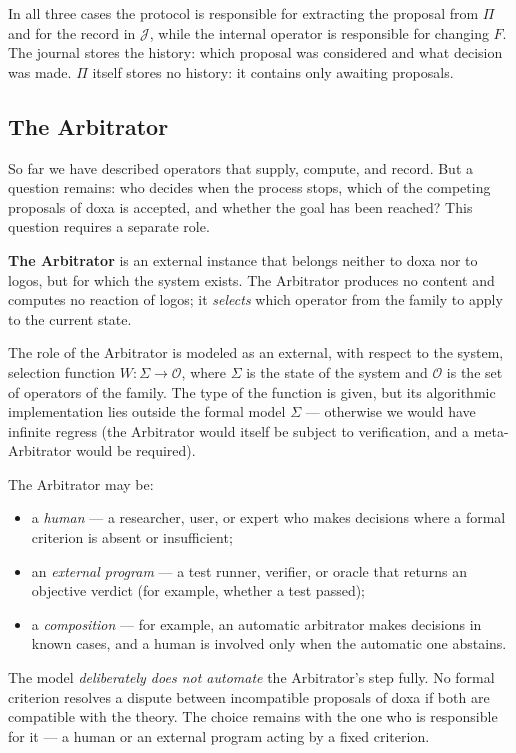 \documentclass[12pt,a4paper]{article}
\begin{document}
In all three cases the protocol is responsible for extracting the proposal
from $\Pi$ and for the record in $\mathcal{J}$, while the internal operator is
responsible for changing $F$. The journal stores the history: which proposal
was considered and what decision was made. $\Pi$ itself stores no history: it
contains only awaiting proposals.

\subsection{The Arbitrator}
\label{sec:arbiter}

So far we have described operators that supply, compute, and record. But a
question remains: who decides when the process stops, which of the competing
proposals of doxa is accepted, and whether the goal has been reached? This
question requires a separate role.

\textbf{The Arbitrator} is an external instance that belongs neither to doxa
nor to logos, but for which the system exists. The Arbitrator produces no
content and computes no reaction of logos; it \emph{selects} which operator
from the family to apply to the current state.

The role of the Arbitrator is modeled as an external, with respect to the
system, selection function $W: \Sigma \to \mathcal{O}$, where $\Sigma$ is the
state of the system and $\mathcal{O}$ is the set of operators of the family.
The type of the function is given, but its algorithmic implementation lies
outside the formal model $\Sigma$ --- otherwise we would have infinite regress
(the Arbitrator would itself be subject to verification, and a meta-Arbitrator
would be required).

The Arbitrator may be:
\begin{itemize}
    \item a \emph{human} --- a researcher, user, or expert who makes decisions
          where a formal criterion is absent or insufficient;
    \item an \emph{external program} --- a test runner, verifier, or oracle
          that returns an objective verdict (for example, whether a test
          passed);
    \item a \emph{composition} --- for example, an automatic arbitrator makes
          decisions in known cases, and a human is involved only when the
          automatic one abstains.
\end{itemize}

The model \emph{deliberately does not automate} the Arbitrator's step fully.
No formal criterion resolves a dispute between incompatible proposals of doxa
if both are compatible with the theory. The choice remains with the one who is
responsible for it --- a human or an external program acting by a fixed
criterion.
\end{document}
